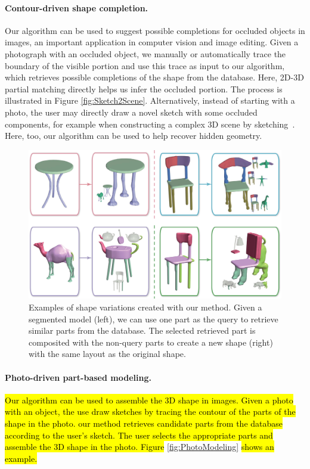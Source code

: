 \paragraph*{Contour-driven shape completion.} Our algorithm can be used to suggest possible completions for occluded objects in images, an important application in computer vision and image editing. Given a photograph with an occluded object, we manually or automatically trace the boundary of the visible portion and use this trace as input to our algorithm, which retrieves possible completions of the shape from the database. Here, 2D-3D partial matching directly helps us infer the occluded portion. The process is illustrated in Figure \ref{fig:Sketch2Scene}. Alternatively, instead of starting with a photo, the user may directly draw a novel sketch with some occluded components, for example when constructing a complex 3D scene by sketching~\cite{KunXu2013}. Here, too, our algorithm can be used to help recover hidden geometry.

\begin{figure}\centering
\includegraphics[width=\linewidth]{./Material/ShapeVariation.pdf}
\caption{Examples of shape variations created with our method. Given a segmented model (left), we can use one part as the query to retrieve similar parts from the database. The selected retrieved part is composited with the non-query parts to create a new shape (right) with the same layout as the original shape.}\label{fig:SegedAsInput}
\end{figure}

\paragraph*{Photo-driven part-based modeling.} \hl{Our algorithm can be used to assemble the 3D shape in images. Given a photo with an object, the use draw sketches by tracing the contour of the parts of the shape in the photo. our method retrieves candidate parts from the database according to the user's sketch. The user selects the appropriate parts and assemble the 3D shape in the photo. Figure } \ref{fig:PhotoModeling}\hl{ shows an example.}

